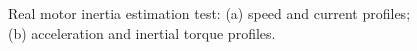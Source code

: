 \documentclass[11pt]{article}
\begin{document}
		\begin{figure}[h!]
		\centering
		\quad
		\caption{Real motor inertia estimation test: (a) speed and current profiles; (b) acceleration and inertial torque profiles.}
		\end{figure}
	
\end{document}
